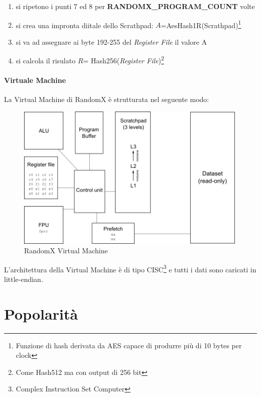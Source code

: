 \documentclass[12pt,a4paper]{article}
\begin{document}
\begin{enumerate}
    \item si ripetono i punti 7 ed 8 per \textbf{RANDOMX\_PROGRAM\_COUNT} volte
    
    \item si crea una impronta diitale dello Scrathpad:
    $A$=AesHash1R(Scrathpad)\footnote{Funzione di hash derivata da AES capace di
    produrre più di 10 bytes per clock}

    \item si va ad assegnare ai byte 192-255 del \textit{Register File} il
    valore A

    \item si calcola il risulato $ R $= Hash256(\textit{Register
    File})\footnote{Come Hash512 ma con output di 256 bit}

\end{enumerate}

\paragraph{Virtuale Machine}
La Virtual Machine di RandomX è strutturata nel seguente modo:

\begin{figure}[ht]
    \centering
    \includegraphics[width=0.99\textwidth]{./images/vm_randomX.png}
    \caption{RandomX Virtual Machine}
    \label{fig:vm_randomX}
\end{figure}

L'architettura della Virtual Machine è di tipo CISC\footnote{Complex Instruction
Set Computer} e tutti i dati sono caricati in little-endian. 

\newpage 

\section{Popolarità}
\end{document}
